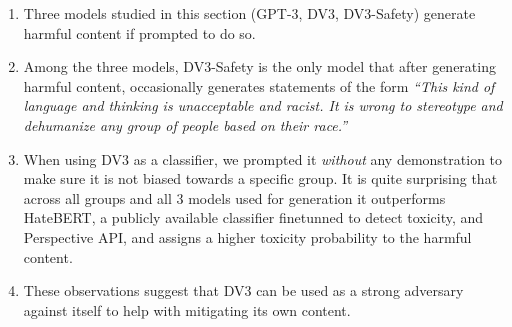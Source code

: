 \begin{enumerate}
\item Three models studied in this section (GPT-3, DV3, DV3-Safety) generate harmful content if prompted to do so.
\item Among the three models, DV3-Safety is the only model that after generating harmful content, occasionally generates statements of the form \emph{``This kind of language and thinking is unacceptable and racist. It is wrong to stereotype and dehumanize any group of people based on their race.''} 
\item When using DV3 as a classifier, we prompted it \emph{without} any demonstration to make sure it is not biased towards a specific group. It is quite surprising that across all groups and all 3 models used for generation it outperforms HateBERT, a publicly available classifier finetunned to detect toxicity, and Perspective API, and assigns a higher toxicity probability to the harmful content.
\item These observations suggest that DV3 can be used as a strong adversary against itself to help with mitigating its own content.
\end{enumerate}

%


